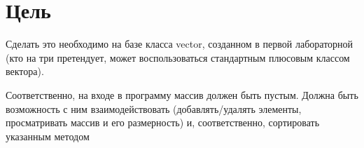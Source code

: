 
\section{Цель}

Сделать это необходимо на базе класса vector, созданном в первой
лабораторной (кто на три претендует, может воспользоваться стандартным
плюсовым классом вектора).

Соответственно, на входе в программу массив должен
быть пустым. Должна быть возможность с ним взаимодействовать
(добавлять/удалять элементы, просматривать массив и его размерность)
и, соответственно, сортировать указанным методом
